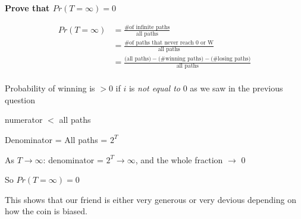 \documentclass[]{article}
\begin{document}
\textbf{Prove that \(Pr(T = \infty) = 0\)}

\[
\begin{aligned}
Pr(T = \infty) &= \frac{\text{\# of infinite paths}}{\text{all paths}} \\
&= \frac{\text{\# of paths that never reach 0 or W}}{\text{all paths}} \\
&= \frac{\text{(all paths)} - \text{(\# winning paths)} - \text{(\# losing paths)}}{\text{all paths}} \\
\end{aligned}
\]

Probability of winning is \(> 0\) if \(i\) is \emph{not equal to} \(0\)
as we saw in the previous question

numerator \(<\) all paths

Denominator = All paths = \(2^T\)

As \(T \rightarrow \infty\): denominator = \(2^T \rightarrow \infty\),
and the whole fraction \(\rightarrow\) \(0\)

So \(Pr(T = \infty) = 0\)

This shows that our friend is either very generous or very devious
depending on how the coin is biased.
\end{document}
